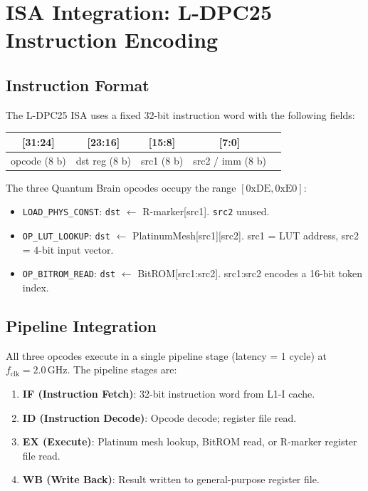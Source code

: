 
\section{ISA Integration: L-DPC25 Instruction Encoding}
\label{sec:flos77-isa}

\subsection{Instruction Format}

The L-DPC25 ISA uses a fixed 32-bit instruction word with the following fields:
%
\begin{center}
\begin{tabular}{|c|c|c|c|c|}
  \hline
  \textbf{[31:24]} & \textbf{[23:16]} & \textbf{[15:8]} & \textbf{[7:0]} \\
  \hline
  opcode (8 b) & dst reg (8 b) & src1 (8 b) & src2 / imm (8 b) \\
  \hline
\end{tabular}
\end{center}
%
\noindent
The three Quantum Brain opcodes occupy the range $[0\text{xDE}, 0\text{xE0}]$:
%
\begin{itemize}
  \item \texttt{LOAD\_PHYS\_CONST}: \texttt{dst} $\leftarrow$ R-marker[src1].
        \texttt{src2} unused.
  \item \texttt{OP\_LUT\_LOOKUP}: \texttt{dst} $\leftarrow$ PlatinumMesh[src1][src2].
        src1 = LUT address, src2 = 4-bit input vector.
  \item \texttt{OP\_BITROM\_READ}: \texttt{dst} $\leftarrow$ BitROM[src1:src2].
        src1:src2 encodes a 16-bit token index.
\end{itemize}

\subsection{Pipeline Integration}

All three opcodes execute in a single pipeline stage (latency = 1 cycle) at
$f_{\text{clk}} = 2.0\,\text{GHz}$.
The pipeline stages are:

\begin{enumerate}
  \item \textbf{IF (Instruction Fetch)}: 32-bit instruction word from L1-I cache.
  \item \textbf{ID (Instruction Decode)}: Opcode decode; register file read.
  \item \textbf{EX (Execute)}: Platinum mesh lookup, BitROM read, or
        R-marker register file read.
  \item \textbf{WB (Write Back)}: Result written to general-purpose register file.
\end{enumerate}

